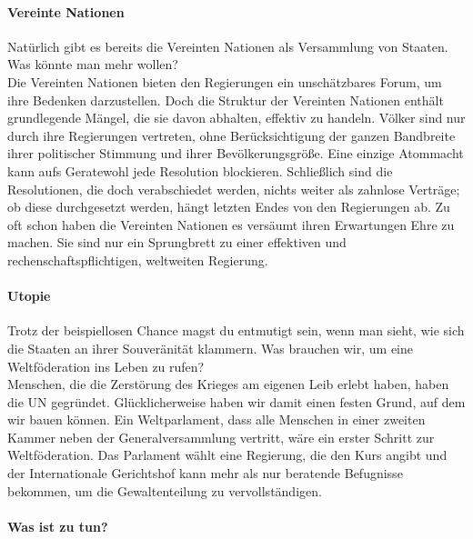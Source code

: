 \documentclass[11pt,a4paper]{article}
\begin{document}
\begin{multicols}{2}
\paragraph{Vereinte Nationen}

Natürlich gibt es bereits die Vereinten Nationen als Versammlung von Staaten. Was könnte man mehr wollen?\\
\noindent Die Vereinten Nationen bieten den Regierungen ein unschätzbares Forum, um ihre Bedenken darzustellen.
Doch die Struktur der Vereinten Nationen enthält grundlegende Mängel, die sie davon abhalten, effektiv zu handeln.
Völker sind nur durch ihre Regierungen vertreten, ohne Berücksichtigung der ganzen Bandbreite ihrer politischer Stimmung und ihrer Bevölkerungsgröße.
Eine einzige Atommacht kann aufs Geratewohl jede  Resolution blockieren.
Schließlich sind die Resolutionen, die doch verabschiedet werden, nichts weiter als zahnlose Verträge; ob diese durchgesetzt werden, hängt letzten Endes von den Regierungen ab.
Zu oft schon haben die Vereinten Nationen es versäumt ihren Erwartungen Ehre zu machen.
Sie sind nur ein Sprungbrett zu einer effektiven und rechenschaftspflichtigen, weltweiten Regierung.


\paragraph{Utopie}

Trotz der beispiellosen Chance magst du entmutigt sein, wenn man sieht, wie sich die Staaten an ihrer Souveränität klammern. Was brauchen wir, um eine Weltföderation ins Leben zu rufen?\\
\noindent Menschen, die die Zerstörung des Krieges am eigenen Leib erlebt haben, haben die UN gegründet. Glücklicherweise haben wir damit einen festen Grund, auf dem wir bauen können.
Ein Weltparlament, dass alle Menschen in einer zweiten Kammer neben der Generalversammlung vertritt, wäre ein erster Schritt zur Weltföderation.
Das Parlament wählt eine Regierung, die den Kurs angibt und der Internationale Gerichtshof kann mehr als nur beratende Befugnisse bekommen, um die Gewaltenteilung zu vervollständigen.

\end{multicols}

\paragraph{Was ist zu tun?}
\end{document}
